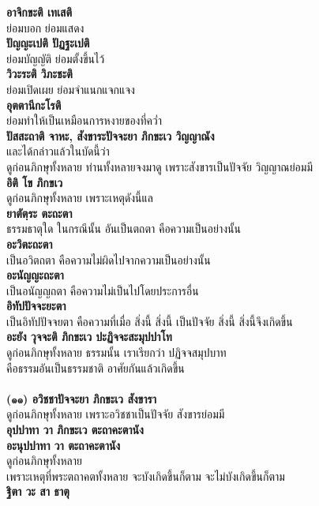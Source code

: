 \documentclass[12pt]{article}
\begin{document}
\textbf{อาจิกขะติ เทเสติ}\\
\indent ย่อมบอก ย่อมแสดง\\
\textbf{ปัญญะเปติ ปัฏฐะเปติ}\\
\indent ย่อมบัญญัติ ย่อมตั้งขึ้นไว้\\
\textbf{วิวะระติ วิภะชะติ}\\
\indent ย่อมเปิดเผย ย่อมจำแนกแจกแจง\\
\textbf{อุตตานีกะโรติ}\\
\indent ย่อมทำให้เป็นเหมือนการหงายของที่คว่ำ\\
\textbf{ปัสสะถาติ จาหะ, สังขาระปัจจะยา ภิกขะเว วิญญาณัง}\\
\indent และได้กล่าวแล้วในบัดนี้ว่า \\
\indent ดูก่อนภิกษุทั้งหลาย ท่านทั้งหลายจงมาดู เพราะสังขารเป็นปัจจัย วิญญาณย่อมมี\\
\textbf{อิติ โข ภิกขเว}\\
\indent ดูก่อนภิกษุทั้งหลาย เพราะเหตุดังนี้แล\\
\textbf{ยาตัตฺระ ตะถะตา}\\
\indent ธรรมธาตุใด ในกรณีนั้น อันเป็นตถตา คือความเป็นอย่างนั้น\\
\textbf{อะวิตะถะตา}\\
\indent เป็นอวิตถตา คือความไม่ผิดไปจากความเป็นอย่างนั้น\\
\textbf{อะนัญญะถะตา}\\
\indent เป็นอนัญญถตา คือความไม่เป็นไปโดยประการอื่น\\
\textbf{อิทัปปัจจะยะตา}\\
\indent เป็นอิทัปปัจจยตา คือความที่เมื่อ สิ่งนี้ สิ่งนี้ เป็นปัจจัย สิ่งนี้ สิ่งนี้จึงเกิดขึ้น\\
\textbf{อะยัง วุจจะติ ภิกขะเว ปะฏิจจะสะมุปปาโท}\\
\indent ดูก่อนภิกษุทั้งหลาย ธรรมนั้น เราเรียกว่า ปฏิจจสมุปบาท \\
\indent คือธรรมอันเป็นธรรมชาติ อาศัยกันแล้วเกิดขึ้น\\
\\
\textbf{(๑๑) อวิชชาปัจจะยา ภิกขะเว สังขารา}\\
\indent ดูก่อนภิกษุทั้งหลาย เพราะอวิชชาเป็นปัจจัย สังขารย่อมมี\\
\textbf{อุปปาทา วา ภิกขะเว ตะถาคะตานัง\\
อะนุปปาทา วา ตะถาคะตานัง}\\
\indent ดูก่อนภิกษุทั้งหลาย\\
\indent เพราะเหตุที่พระตถาคตทั้งหลาย จะบังเกิดขึ้นก็ตาม จะไม่บังเกิดขึ้นก็ตาม\\
\textbf{ฐิตา วะ สา ธาตุ}\\
\end{document}
